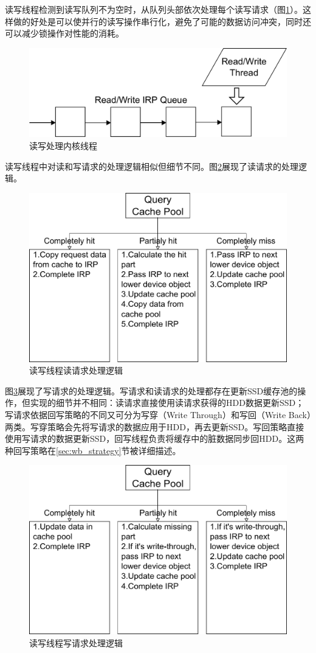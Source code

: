 读写线程检测到读写队列不为空时，从队列头部依次处理每个读写请求（图\ref{fig:df-rw-thread}）。这样做的好处是可以使并行的读写操作串行化，避免了可能的数据访问冲突，同时还可以减少锁操作对性能的消耗。

\begin{figure}[H]
\centering
\includegraphics[width=0.5\linewidth]{./graph/df-rw-thread}
\caption{读写处理内核线程}
\label{fig:df-rw-thread}
\end{figure}

读写线程中对读和写请求的处理逻辑相似但细节不同。图\ref{fig:df-proc-read}展现了读请求的处理逻辑。

\begin{figure}[H]
\centering
\includegraphics[width=0.75\linewidth]{./graph/df-proc-read}
\caption{读写线程读请求处理逻辑}
\label{fig:df-proc-read}
\end{figure}

图\ref{fig:df-proc-write}展现了写请求的处理逻辑。写请求和读请求的处理都存在更新SSD缓存池的操作，但实现的细节并不相同：读请求直接使用读请求获得的HDD数据更新SSD；写请求依据回写策略的不同又可分为写穿（Write Through）和写回（Write Back）两类。写穿策略会先将写请求的数据应用于HDD，再去更新SSD。写回策略直接使用写请求的数据更新SSD，回写线程负责将缓存中的脏数据同步回HDD。这两种回写策略在\ref{sec:wb_strategy}节被详细描述。

\begin{figure}[H]
\centering
\includegraphics[width=0.75\linewidth]{./graph/df-proc-write}
\caption{读写线程写请求处理逻辑}
\label{fig:df-proc-write}
\end{figure}

